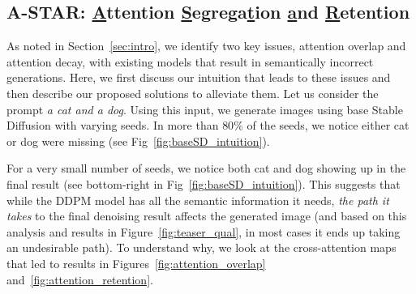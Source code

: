 \documentclass[10pt,twocolumn,letterpaper]{article}
\begin{document}
\subsection{A-STAR: \underline{A}ttention \underline{S}egrega\underline{t}ion \underline{a}nd \underline{R}etention}
\label{sec:asr}

As noted in Section~\ref{sec:intro}, we identify two key issues, attention overlap and attention decay, with existing models that result in semantically incorrect generations. Here, we first discuss our intuition that leads to these issues and then describe our proposed solutions to alleviate them. Let us consider the prompt \textit{a cat and a dog}. Using this input, we generate images using base Stable Diffusion \cite{rombach2022high} with varying seeds. In more than $80\%$ of the seeds, we notice either cat or dog were missing (see Fig~\ref{fig:baseSD_intuition}). 

For a very small number of seeds, we notice both cat and dog showing up in the final result (see bottom-right in Fig~\ref{fig:baseSD_intuition}). This suggests that while the DDPM model has all the semantic information it needs, \textit{the path it takes} to the final denoising result affects the generated image (and based on this analysis and results in Figure~\ref{fig:teaser_qual}, in most cases it ends up taking an undesirable path). To understand why, we look at the cross-attention maps that led to results in Figures~\ref{fig:attention_overlap} and~\ref{fig:attention_retention}.
\end{document}

